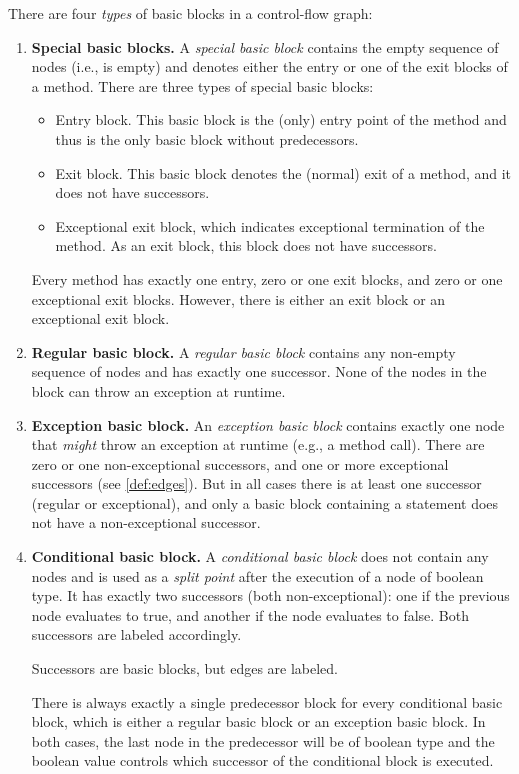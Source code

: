 \begin{definition}
    There are four \emph{types} of basic blocks in a control-flow graph:
    \begin{enumerate}
        \item \textbf{Special basic blocks.} A \emph{special basic block} contains
        the empty sequence of nodes (i.e., is empty) and denotes either the
        entry or one of the exit blocks of a method. There are three types
        of special basic blocks:
        \begin{itemize}
            \item Entry block. This basic block is the (only) entry point of the
            method and thus is the only basic block without predecessors.
            \item Exit block. This basic block denotes the (normal) exit of
            a method, and it does not have successors.
            \item Exceptional exit block, which indicates exceptional termination
            of the method. As an exit block, this block does not have successors.
        \end{itemize}
        Every method has exactly one entry, zero or one exit blocks, and zero or one
        exceptional exit blocks. However, there is either an exit block or an exceptional
        exit block.
        \item \textbf{Regular basic block.} A \emph{regular basic block} contains
        any non-empty sequence of nodes and has exactly one successor.
        None of the nodes in the block can throw an exception at runtime.
        \item \textbf{Exception basic block.} An \emph{exception basic block} contains exactly
        one node that \emph{might} throw an exception at runtime (e.g., a method call).
        There are zero or one non-exceptional successors, and one
        or more exceptional successors (see \autoref{def:edges}). But in all cases there
        is at least one successor (regular or exceptional), and only a basic block
        containing a  statement does not have a non-exceptional successor.
        \item \textbf{Conditional basic block.} A \emph{conditional basic block}
        does not contain any nodes and is used as a \emph{split point} after the execution
        of a node of boolean type. It has exactly two successors (both non-exceptional): one
        if the previous node evaluates to true, and another
        if the node evaluates to false. Both successors are labeled accordingly.
\begin{workinprogress}
Successors are basic blocks, but edges are labeled.
\end{workinprogress}


        There is always exactly a single predecessor block for every conditional basic block, which
        is either a regular basic block or an exception basic block. In both cases, the last node
        in the predecessor will be of boolean type
        and the boolean value controls which successor of the conditional block is executed.
    \end{enumerate}
\end{definition}

